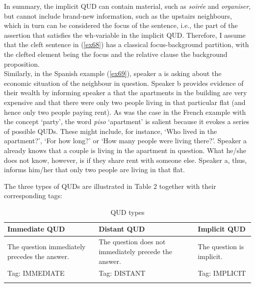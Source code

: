 \begin{description}
In summary, the implicit QUD can contain material, such as \textit{soirée} and \textit{organiser}, but cannot include brand-new information, such as the upstairs neighbours, which in turn can be considered the focus of the sentence, i.e., the part of the assertion that satisfies the wh-variable in the implicit QUD.
Therefore, I assume that the cleft sentence in (\ref{ex68}) has a classical focus-background partition, with the clefted element being the focus and the relative clause the background proposition.\\
Similarly, in the Spanish example (\ref{ex69}), speaker a is asking about the economic situation of the neighbour in question. Speaker b provides evidence of their wealth by informing speaker a that the apartments in the building are very expensive and that there were only two people living in that particular flat (and hence only two people paying rent). As was the case in the French example with the concept `party', the word \textit{piso} `apartment' is salient because it evokes a series of possible QUDs. These might include, for instance, `Who lived in the apartment?', `For how long?' or `How many people were living there?'. Speaker a already knows that a couple is living in the apartment in question. What he/she does not know, however, is if they share rent with someone else. Speaker a, thus, informs him/her that only two people are living in that flat.
\end{description}



The three types of QUDs are illustrated in Table 2 together with their corresponding tags:\\

\begin{table}
    
   \begin{tabularx}{0.9\textwidth} { 
   Q
   Q
     Q  }
 \lsptoprule
 \textbf{Immediate QUD} & \textbf{Distant QUD} & \textbf{Implicit QUD} \\
\midrule
\small The question immediately precedes the answer.  & \small The question does not immediately precede the answer. &  \small The question is implicit.  \\
\midrule
Tag: \small {\selectfont IMMEDIATE} & Tag: \small {\selectfont DISTANT} & Tag: \small {\selectfont IMPLICIT} \\
\lspbottomrule
\end{tabularx}\\
    \caption{QUD types}
\end{table}


